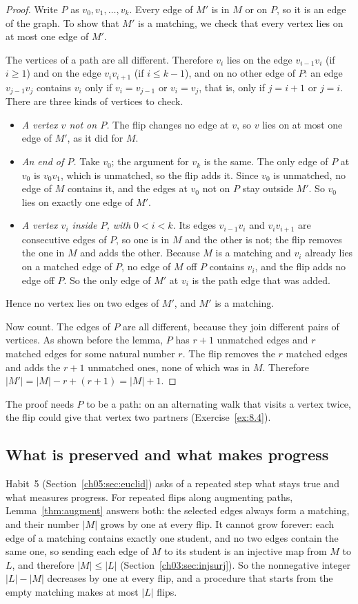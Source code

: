 \begin{proof}
Write $P$ as $v_0,v_1,\ldots,v_k$. Every edge of $M'$ is in $M$ or on $P$, so it is an edge of the graph. To show that $M'$ is a matching, we check that every vertex lies on at most one edge of $M'$.

The vertices of a path are all different. Therefore $v_i$ lies on the edge $v_{i-1}v_i$ (if $i\ge1$) and on the edge $v_iv_{i+1}$ (if $i\le k-1$), and on no other edge of $P$: an edge $v_{j-1}v_j$ contains $v_i$ only if $v_i=v_{j-1}$ or $v_i=v_j$, that is, only if $j=i+1$ or $j=i$. There are three kinds of vertices to check.
\begin{itemize}
\item \emph{A vertex $v$ not on $P$.} The flip changes no edge at $v$, so $v$ lies on at most one edge of $M'$, as it did for $M$.
\item \emph{An end of $P$.} Take $v_0$; the argument for $v_k$ is the same. The only edge of $P$ at $v_0$ is $v_0v_1$, which is unmatched, so the flip adds it. Since $v_0$ is unmatched, no edge of $M$ contains it, and the edges at $v_0$ not on $P$ stay outside $M'$. So $v_0$ lies on exactly one edge of $M'$.
\item \emph{A vertex $v_i$ inside $P$, with $0<i<k$.} Its edges $v_{i-1}v_i$ and $v_iv_{i+1}$ are consecutive edges of $P$, so one is in $M$ and the other is not; the flip removes the one in $M$ and adds the other. Because $M$ is a matching and $v_i$ already lies on a matched edge of $P$, no edge of $M$ off $P$ contains $v_i$, and the flip adds no edge off $P$. So the only edge of $M'$ at $v_i$ is the path edge that was added.
\end{itemize}
Hence no vertex lies on two edges of $M'$, and $M'$ is a matching.

Now count. The edges of $P$ are all different, because they join different pairs of vertices. As shown before the lemma, $P$ has $r+1$ unmatched edges and $r$ matched edges for some natural number $r$. The flip removes the $r$ matched edges and adds the $r+1$ unmatched ones, none of which was in $M$. Therefore $|M'|=|M|-r+(r+1)=|M|+1$.
\end{proof}

The proof needs $P$ to be a path: on an alternating walk that visits a vertex twice, the flip could give that vertex two partners (Exercise~\ref{ex:8.4}).

\subsection*{What is preserved and what makes progress}
Habit~5 (Section~\ref{ch05:sec:euclid}) asks of a repeated step what stays true and what measures progress. For repeated flips along augmenting paths, Lemma~\ref{thm:augment} answers both: the selected edges always form a matching, and their number $|M|$ grows by one at every flip. It cannot grow forever: each edge of a matching contains exactly one student, and no two edges contain the same one, so sending each edge of $M$ to its student is an injective map from $M$ to $L$, and therefore $|M|\le|L|$ (Section~\ref{ch03:sec:injsurj}). So the nonnegative integer $|L|-|M|$ decreases by one at every flip, and a procedure that starts from the empty matching makes at most $|L|$ flips.

